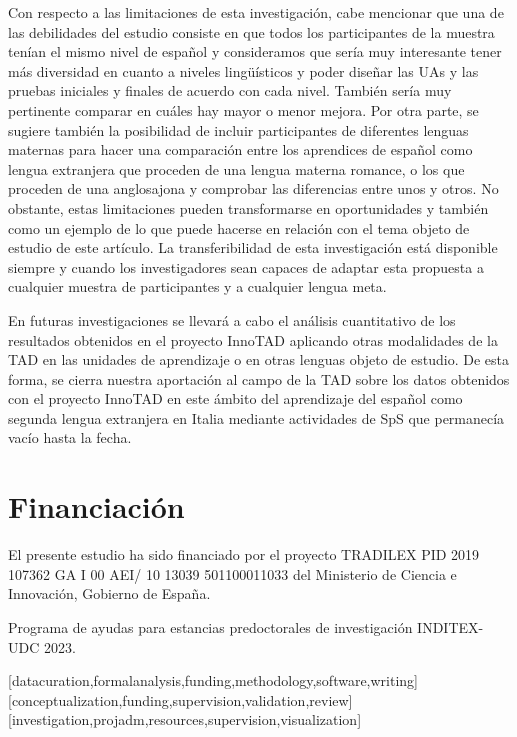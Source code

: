 \documentclass[spanish]{textolivre}
\begin{document}
Con respecto a las limitaciones de esta investigación, cabe mencionar que una de las debilidades del estudio consiste en que todos los participantes de la muestra tenían el mismo nivel de español y consideramos que sería muy interesante tener más diversidad en cuanto a niveles lingüísticos y poder diseñar las UAs y las pruebas iniciales y finales de acuerdo con cada nivel. También sería muy pertinente comparar en cuáles hay mayor o menor mejora. Por otra parte, se sugiere también la posibilidad de incluir participantes de diferentes lenguas maternas para hacer una comparación entre los aprendices de español como lengua extranjera que proceden de una lengua materna romance, o los que proceden de una anglosajona y comprobar las diferencias entre unos y otros. No obstante, estas limitaciones pueden transformarse en oportunidades y también como un ejemplo de lo que puede hacerse en relación con el tema objeto de estudio de este artículo. La transferibilidad de esta investigación está disponible siempre y cuando los investigadores sean capaces de adaptar esta propuesta a cualquier muestra de participantes y a cualquier lengua meta.

En futuras investigaciones se llevará a cabo el análisis cuantitativo de los resultados obtenidos en el proyecto InnoTAD aplicando otras modalidades de la TAD en las unidades de aprendizaje o en otras lenguas objeto de estudio. De esta forma, se cierra nuestra aportación al campo de la TAD sobre los datos obtenidos con el proyecto InnoTAD en este ámbito del aprendizaje del español como segunda lengua extranjera en Italia mediante actividades de SpS que permanecía vacío hasta la fecha.

\section*{Financiación}\label{sec-organizacao}
El presente estudio ha sido financiado por el proyecto TRADILEX PID 2019 107362 GA I 00 AEI/ 10 13039 501100011033 del Ministerio de Ciencia e Innovación, Gobierno de España. 

Programa de ayudas para estancias predoctorales de investigación INDITEX-UDC 2023.

\printbibliography\label{sec-bib}


\begin{contributors}
[datacuration,formalanalysis,funding,methodology,software,writing]
[conceptualization,funding,supervision,validation,review]
[investigation,projadm,resources,supervision,visualization]
\end{contributors}
\end{document}

